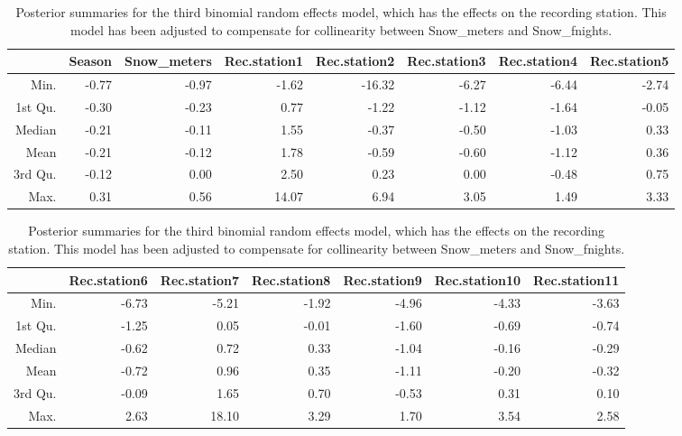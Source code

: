 \documentclass[10pt]{extarticle}
\begin{document}
\begin{table}[H]
	\centering
	\footnotesize
	\begin{tabular}{r|rrrrrrr}
		\hline
		& Season & Snow\_meters & Rec.station1 & Rec.station2 & Rec.station3 & Rec.station4 & Rec.station5 \\ 
		\hline
		Min. & -0.77 & -0.97 & -1.62 & -16.32 & -6.27 & -6.44 & -2.74 \\ 
		1st Qu. & -0.30 & -0.23 & 0.77 & -1.22 & -1.12 & -1.64 & -0.05 \\ 
		Median & -0.21 & -0.11 & 1.55 & -0.37 & -0.50 & -1.03 & 0.33 \\ 
		Mean & -0.21 & -0.12 & 1.78 & -0.59 & -0.60 & -1.12 & 0.36 \\ 
		3rd Qu. & -0.12 & 0.00 & 2.50 & 0.23 & 0.00 & -0.48 & 0.75 \\ 
		Max. & 0.31 & 0.56 & 14.07 & 6.94 & 3.05 & 1.49 & 3.33 \\ 
		\hline
	\end{tabular}

\vspace{1em}

	\begin{tabular}{r|rrrrrr}
		\hline
		& Rec.station6 & Rec.station7 & Rec.station8 & Rec.station9 & Rec.station10 & Rec.station11 \\ 
		\hline
		Min. & -6.73 & -5.21 & -1.92 & -4.96 & -4.33 & -3.63 \\ 
		1st Qu. & -1.25 & 0.05 & -0.01 & -1.60 & -0.69 & -0.74 \\ 
		Median & -0.62 & 0.72 & 0.33 & -1.04 & -0.16 & -0.29 \\ 
		Mean & -0.72 & 0.96 & 0.35 & -1.11 & -0.20 & -0.32 \\ 
		3rd Qu. & -0.09 & 1.65 & 0.70 & -0.53 & 0.31 & 0.10 \\ 
		Max. & 2.63 & 18.10 & 3.29 & 1.70 & 3.54 & 2.58 \\ 
		\hline
	\end{tabular}
\caption{Posterior summaries for the third binomial random effects model, which has the effects on the recording station. This model has been adjusted to compensate for collinearity between Snow\_meters and Snow\_fnights.}
\label{tab:postsum_binmod3}
\end{table}
\end{document}
